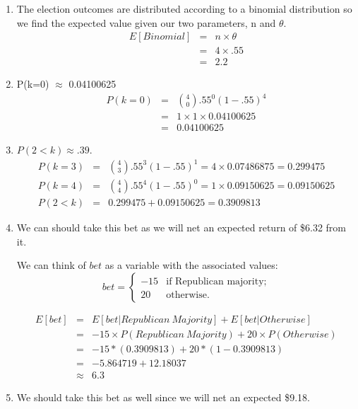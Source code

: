 \documentclass[11pt]{article}
\begin{document}
\begin{enumerate}
\item The election outcomes are distributed according to a binomial distribution so we find the expected value given our two parameters, n and $\theta$. 	
	\begin{eqnarray*}
	 E[Binomial] &=& n \times \theta \\
	 &=& 4 \times .55\\
	 &=& 2.2
	\end{eqnarray*}
	
\item P(k=0) $\approx$  0.04100625
	\begin{eqnarray*}
	P(k=0) &=& \binom{4}{0} .55^0 (1-.55)^{4}\\
	&=& 1 \times 1 \times 0.04100625\\
	&=&  0.04100625
	\end{eqnarray*}
	
\item $P(2 < k) \approx .39$. 
	\begin{eqnarray*}
	P(k=3) &=& \binom{4}{3} .55^3 (1-.55)^{1} = 4 \times 0.07486875 = 0.299475 \\
	P(k=4) &=& \binom{4}{4} .55^4 (1-.55)^{0} = 1 \times  0.09150625 = 0.09150625\\
	P(2 < k) &=& 0.299475 + 0.09150625 = 0.3909813
	\end{eqnarray*}
	
\item We can should take this bet as we will net an expected return of \$6.32 from it. 

We can think of $bet$ as a variable with the associated values:
\[ bet = \left\{ \begin{array}{ll}
         -15 & \mbox{if Republican majority};\\
        20 & \mbox{otherwise}.\end{array} \right. \]
 

	\begin{eqnarray*}
	E[bet] &=& E[bet | Republican \ Majority] + E[bet | Otherwise]\\
	&=& -15 \times P(Republican \ Majority) + 20 \times P(Otherwise)\\
	&=& -15*(0.3909813) +  20*(1-0.3909813)\\
	&=& - 5.864719 + 12.18037\\
	&\approx& 6.3
	\end{eqnarray*}

\item 
We should take this bet as well since we will net an expected \$9.18. 


\end{enumerate}
\end{document}
